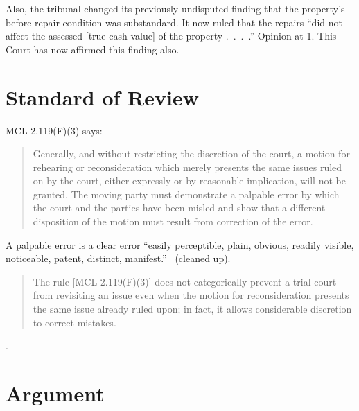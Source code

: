 \documentclass[12pt,\documentclassflag]{michiganCourtOfAppealsBrief}
\begin{document}
Also, the tribunal changed its previously undisputed finding that the property's before-repair condition was substandard. It now ruled that the repairs ``did not affect the assessed [true cash value] of the property .~.~.~.'' Opinion at 1. This Court has now affirmed this finding also.


\section{Standard of Review}

MCL 2.119(F)(3) says:

\begin{quote}
  Generally, and without restricting the discretion of the court, a motion for rehearing or reconsideration which merely presents the same issues ruled on by the court, either expressly or by reasonable implication, will not be granted. The moving party must demonstrate a palpable error by which the court and the parties have been misled and show that a different disposition of the motion must result from correction of the error.
\end{quote}

 A palpable error is a clear error ``easily perceptible, plain, obvious, readily
 visible, noticeable, patent, distinct, manifest.'' \ (cleaned up).
 

 \begin{quote}
   The rule [MCL 2.119(F)(3)] does not categorically prevent a trial court from revisiting an issue even when the motion for reconsideration presents the same issue already ruled upon; in fact, it allows considerable discretion to correct mistakes.
 \end{quote}
 . 

\section{Argument}



\end{document}
